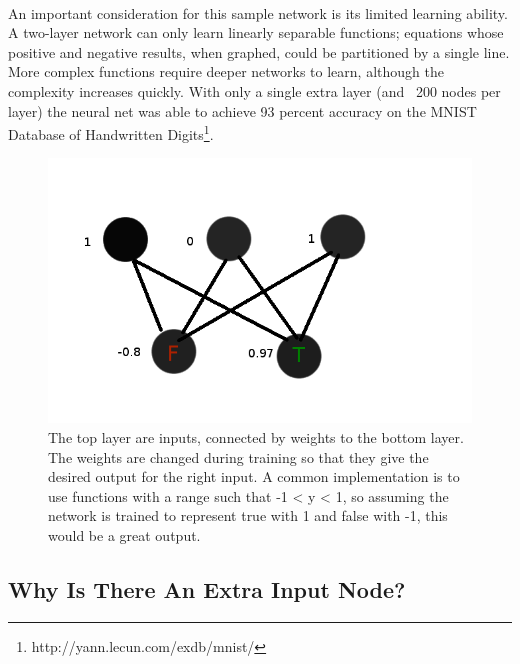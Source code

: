 \documentclass{article}
\begin{document}
    \paragraph{}An important consideration for this sample network is its limited learning
    ability. A two-layer network can only learn linearly separable functions; equations
    whose positive and negative results, when graphed, could be partitioned by a single line.
    More complex functions require deeper networks to learn, although the complexity
    increases quickly. With only a single extra layer (and ~200 nodes per layer) the
    neural net was able to achieve 93 percent accuracy on the MNIST Database of Handwritten
    Digits\footnote{http://yann.lecun.com/exdb/mnist/}.
    \begin{figure}
        \centering
        \includegraphics[scale=0.4]{images/perceptron.png}
        \caption{The top layer are inputs, connected by weights to the bottom layer. The
            weights are changed during training so that they give the desired output for
            the right input. A common implementation is to use functions with a range such 
            that -1 < y < 1, so assuming the network is trained to represent true with 1 
            and false with -1, this would be a great output.}
        \label{basicnetwork}
    \end{figure}
\subsection{Why Is There An Extra Input Node?}
\end{document}
